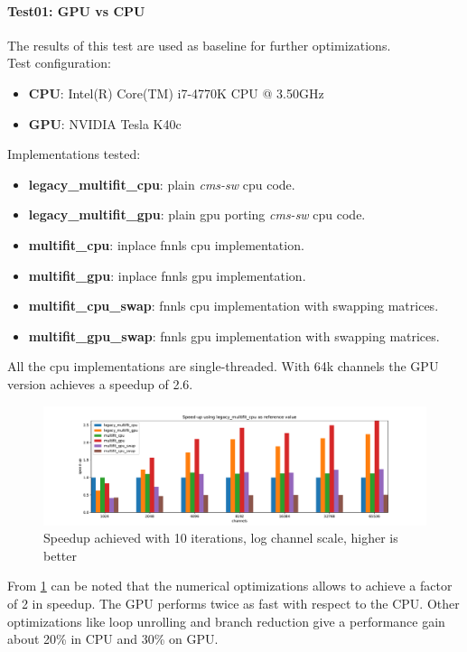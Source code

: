 \paragraph{Test01: GPU vs CPU}
The results of this test are used as baseline for further optimizations. \\
Test configuration:
\begin{itemize}
  \item \textbf{CPU}: Intel(R) Core(TM) i7-4770K CPU @ 3.50GHz 
  \item \textbf{GPU}: NVIDIA Tesla K40c 
\end{itemize}
Implementations tested:
\begin{itemize}
  \item \textbf{legacy\_multifit\_cpu}: plain \textit{cms-sw} cpu code.
  \item \textbf{legacy\_multifit\_gpu}: plain gpu porting \textit{cms-sw} cpu code.
  \item \textbf{multifit\_cpu}: inplace fnnls cpu implementation.
  \item \textbf{multifit\_gpu}: inplace fnnls gpu implementation.
  \item \textbf{multifit\_cpu\_swap}: fnnls cpu implementation with swapping matrices.
  \item \textbf{multifit\_gpu\_swap}: fnnls gpu implementation with swapping matrices.
\end{itemize}
All the cpu implementations are single-threaded. With 64k channels the GPU version achieves a speedup of 2.6. 
\begin{figure}[h]
  \includegraphics[width=\textwidth]{img/speedup}
  \caption{Speedup achieved with 10 iterations, log channel scale, higher is better}
  \label{img:speedup01}
\end{figure}
From \ref{img:speedup01} can be noted that the numerical optimizations allows to achieve a factor of 2 in speedup. The GPU performs twice as fast with respect to the CPU. Other optimizations like loop unrolling and branch reduction give a performance gain about 20\% in CPU and 30\% on GPU.  
